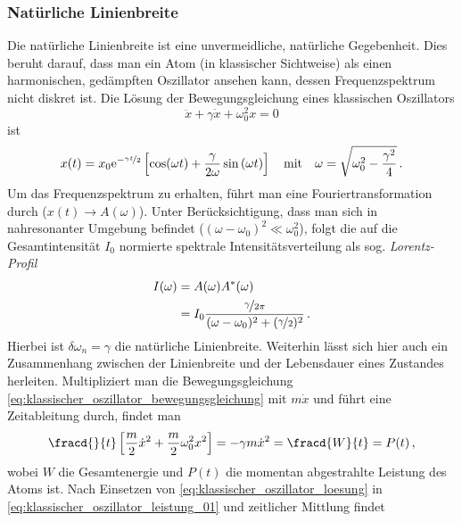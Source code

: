 \subsubsection{Natürliche
Linienbreite}\label{subsubsec:natuerliche_linienbreite}
Die natürliche Linienbreite ist eine unvermeidliche, natürliche Gegebenheit.
Dies beruht darauf, dass man ein Atom (in klassischer Sichtweise) als
einen harmonischen, gedämpften Oszillator ansehen kann, dessen Frequenzspektrum
nicht diskret ist. Die Lösung der Bewegungsgleichung eines klassischen
Oszillators
\begin{equation}\label{eq:klassischer_oszillator_bewegungsgleichung}
	\ddot x+\gamma\dot x+\omega_0^2x=0
\end{equation}
ist
\begin{equation}\label{eq:klassischer_oszillator_loesung}
	x(t)=x_0\mathrm{e}^{-\nicefrac{\gamma t}{2}}\left[\cos(\omega
	t)+\frac{\gamma}{2\omega}\sin{(\omega t)}\right]\quad
	\text{mit}\quad \omega=\sqrt{\omega_0^2-\frac{\gamma^2}{4}}\,.
\end{equation}
Um das Frequenzspektrum zu erhalten, führt man eine Fouriertransformation durch
($x(t)\to A(\omega)$). Unter Berücksichtigung, dass man sich in nahresonanter
Umgebung befindet ($(\omega-\omega_0)^2\ll\omega_0^2$), folgt die auf die
Gesamtintensität $I_0$ normierte spektrale Intensitätsverteilung als sog.
\textit{Lorentz-Profil}
\begin{equation}\label{eq:lorentz-profil}
	\begin{split}
		I(\omega) &=A(\omega)A^*(\omega)\\
		&=
		I_0\frac{\nicefrac{\gamma}{2\pi}}{(\omega-\omega_0)^2+(\nicefrac{\gamma}{2})^2}\,.
	\end{split}
\end{equation}
Hierbei ist $\delta\omega_n=\gamma$ die natürliche Linienbreite. Weiterhin lässt
sich hier auch ein Zusammenhang zwischen der Linienbreite und der Lebensdauer
eines Zustandes herleiten. Multipliziert man die Bewegungsgleichung
\eqref{eq:klassischer_oszillator_bewegungsgleichung} mit $m\dot x$ und führt
eine Zeitableitung durch, findet man
\begin{equation}\label{eq:klassischer_oszillator_leistung_01}
	\fracd{}{t}\left[\frac{m}{2}\dot
	x^2+\frac{m}{2}\omega_0^2x^2\right]=-\gamma m\dot x^2=\fracd{W}{t}=P(t)\,,
\end{equation}
wobei $W$ die Gesamtenergie und $P(t)$ die momentan abgestrahlte Leistung des
Atoms ist. Nach Einsetzen von \eqref{eq:klassischer_oszillator_loesung} in
\eqref{eq:klassischer_oszillator_leistung_01} und zeitlicher Mittlung findet
